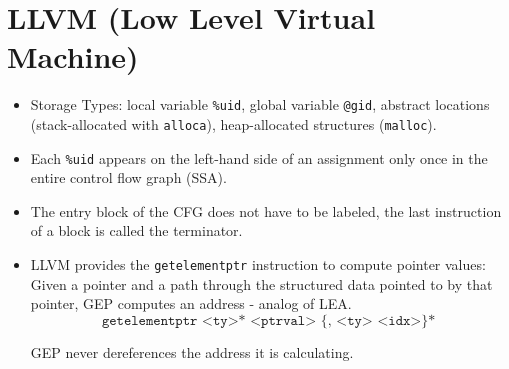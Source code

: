 \section*{LLVM (Low Level Virtual Machine)}
\begin{itemize}
	\item Storage Types: local variable \texttt{\%uid}, global variable \texttt{@gid}, abstract locations (stack-allocated with \texttt{alloca}), heap-allocated structures (\texttt{malloc}).
	
	\item Each \texttt{\%uid} appears on the left-hand side of an assignment only once in the entire control flow graph (SSA).
	
	\item The entry block of the CFG does not have to be labeled, the last instruction of a block is called the terminator.
	
	\item LLVM provides the \texttt{getelementptr} instruction to compute pointer values: Given a pointer and a path through the structured data pointed to by that pointer, GEP computes an address - analog of LEA.
		$$\texttt{getelementptr <ty>* <ptrval> \{, <ty> <idx>\}* }$$
		
		GEP never dereferences the address it is calculating.
	
	
\end{itemize}
